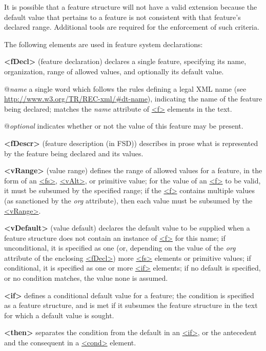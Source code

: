 It is possible that a feature structure will not have a valid extension because the default value that pertains to a feature is not consistent with that feature's declared range. Additional tools are required for the enforcement of such criteria. \par
The following elements are used in feature system declarations: 
\begin{sansreflist}
  
\item [\textbf{<fDecl>}] (feature declaration) declares a single feature, specifying its name, organization, range of allowed values, and optionally its default value.\hfil\\[-10pt]\begin{sansreflist}
    \item[@{\itshape name}]
  a single word which follows the rules defining a legal XML name (see \url{http://www.w3.org/TR/REC-xml/\#dt-name}), indicating the name of the feature being declared; matches the {\itshape name} attribute of \hyperref[TEI.f]{<f>} elements in the text.
    \item[@{\itshape optional}]
  indicates whether or not the value of this feature may be present.
\end{sansreflist}  
\item [\textbf{<fDescr>}] (feature description (in FSD)) describes in prose what is represented by the feature being declared and its values.
\item [\textbf{<vRange>}] (value range) defines the range of allowed values for a feature, in the form of an \hyperref[TEI.fs]{<fs>}, \hyperref[TEI.vAlt]{<vAlt>}, or primitive value; for the value of an \hyperref[TEI.f]{<f>} to be valid, it must be subsumed by the specified range; if the \hyperref[TEI.f]{<f>} contains multiple values (as sanctioned by the {\itshape org} attribute), then each value must be subsumed by the \hyperref[TEI.vRange]{<vRange>}.
\item [\textbf{<vDefault>}] (value default) declares the default value to be supplied when a feature structure does not contain an instance of \hyperref[TEI.f]{<f>} for this name; if unconditional, it is specified as one (or, depending on the value of the {\itshape org} attribute of the enclosing \hyperref[TEI.fDecl]{<fDecl>}) more \hyperref[TEI.fs]{<fs>} elements or primitive values; if conditional, it is specified as one or more \hyperref[TEI.if]{<if>} elements; if no default is specified, or no condition matches, the value none is assumed.
\item [\textbf{<if>}] defines a conditional default value for a feature; the condition is specified as a feature structure, and is met if it subsumes the feature structure in the text for which a default value is sought.
\item [\textbf{<then>}] separates the condition from the default in an \hyperref[TEI.if]{<if>}, or the antecedent and the consequent in a \hyperref[TEI.cond]{<cond>} element.
\end{sansreflist}
